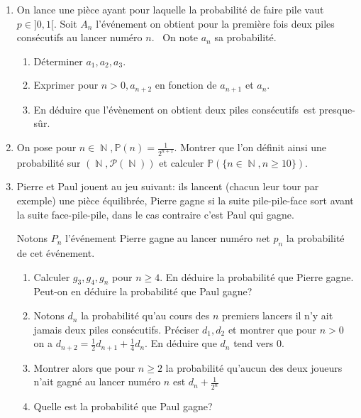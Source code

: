 \documentclass[12pt,a4paper]{article}
\DeclareMathOperator{\N}{\mathbb{N}}
\renewcommand{\Pr}{\mathbb{P}}
\begin{document}
\begin{enumerate}
\item On lance une pièce ayant pour laquelle la probabilité de faire pile vaut $p\in]0,1[$. Soit $A_n$ l'événement \og on obtient pour la première fois deux piles consécutifs au lancer numéro $n$\fg. \ On note $a_n$ sa probabilité.
\begin{enumerate}
	\item Déterminer $a_1,a_2,a_3$.
	\item Exprimer pour $n>0,a_{n+2}$ en fonction de $a_{n+1}$ et $a_n$.
	\item En déduire que l'évènement \og on obtient deux piles consécutifs\fg \  est presque-sûr.
	
\end{enumerate}

\item
On pose pour $n\in\N,\Pr({n})=\frac{1}{2^{n+1}}$. Montrer que l'on définit ainsi une probabilité sur $(\N,\mathcal{P}(\N))$ et calculer $\Pr(\{n\in\N,n\geqslant 10\})$.

\item Pierre et Paul jouent au jeu suivant: ils lancent (chacun leur tour par exemple) une pièce équilibrée, Pierre gagne si la suite pile-pile-face sort avant la suite face-pile-pile, dans le cas contraire c'est Paul qui gagne.

Notons $P_n$ l'événement \og Pierre gagne au lancer numéro $n$\fg et $p_n$ la probabilité de cet événement.
\begin{enumerate}
	\item
	Calculer $g_3,g_4,g_n$ pour $n\geqslant 4$. En déduire la probabilité que Pierre gagne. Peut-on en déduire la probabilité que Paul gagne?
	\item Notons $d_n$ la probabilité qu'au cours des $n$ premiers lancers il n'y ait jamais deux piles consécutifs. Préciser $d_1,d_2$ et montrer que pour $n>0$ on a $d_{n+2}=\frac{1}{2}d_{n+1}+\frac{1}{4}d_n$. En déduire que $d_n$ tend vers $0$.
	\item Montrer alors que pour $n\geqslant 2$ la probabilité qu'aucun des deux joueurs n'ait gagné au lancer numéro $n$ est $d_n+\frac{1}{2^n}$
	\item Quelle est la probabilité que Paul gagne?
	
\end{enumerate}



\end{enumerate}
\end{document}
